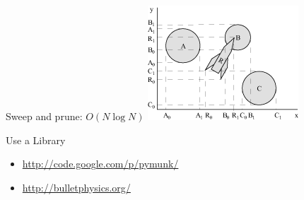 \documentclass[handout,t,compress]{beamer}
\newcommand{\bframe}[1]{\begin{frame}[fragile]{#1}}
\begin{document}
\bframe{Sweep and prune: $O(N\log N)$}
\includegraphics{IGD/SweepAndPrune.png}
\end{frame}



\bframe{Use a Library}
\begin{itemize}
\item  \url{http://code.google.com/p/pymunk/}
\item \url{http://bulletphysics.org/}
\end{itemize}
\end{frame}
\end{document}
